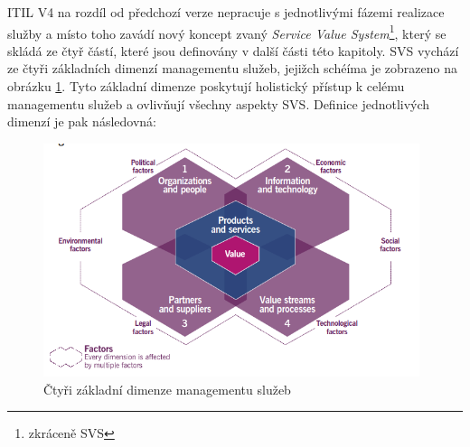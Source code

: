 \documentclass[
  digital,     %
  twoside,     %
  lof,         %
  lot,         %
]{fithesis4}
\begin{document}
ITIL V4 na rozdíl od předchozí verze nepracuje s jednotlivými fázemi realizace služby a místo toho zavádí nový koncept zvaný \emph{Service Value System}\footnote{zkráceně SVS}, který se skládá ze čtyř částí, které jsou definovány v další části této kapitoly. SVS vychází ze čtyři základních dimenzí managementu služeb, jejižch schéíma je zobrazeno na obrázku \ref{fig:itil4_dimension}. Tyto základní dimenze poskytují holistický přístup k celému managementu služeb a ovlivňují všechny aspekty SVS.\parencite[s.~10]{Cartlidge2020} Definice jednotlivých dimenzí je pak následovná:

\begin{figure}[h]
  \begin{center}
          \includegraphics[width=11cm]{img/ITIL_V4_dimesions.png}
  \end{center}
  \caption{Čtyři základní dimenze managementu služeb \parencite[s.~32]{Cartlidge2020}}
  \label{fig:itil4_dimension}
\end{figure} 
\end{document}
